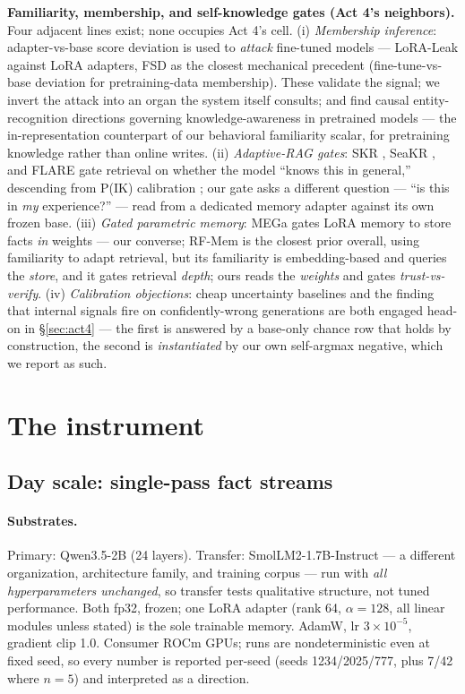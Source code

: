 \documentclass[11pt]{article}
\newcommand{\qwen}{Qwen3.5-2B}
\newcommand{\smol}{SmolLM2-1.7B-Instruct}
\begin{document}
\textbf{Familiarity, membership, and self-knowledge gates (Act 4's neighbors).} Four adjacent
lines exist; none occupies Act 4's cell. (i) \emph{Membership inference}: adapter-vs-base score
deviation is used to \emph{attack} fine-tuned models --- LoRA-Leak \citep{loraleak2025} against
LoRA adapters, FSD \citep{fsd2024} as the closest mechanical precedent (fine-tune-vs-base
deviation for pretraining-data membership). These validate the signal; we invert the attack into
an organ the system itself consults; and \citet{ferrando2025entity} find causal
entity-recognition directions governing knowledge-awareness in pretrained models --- the
in-representation counterpart of our behavioral familiarity scalar, for pretraining knowledge
rather than online writes. (ii) \emph{Adaptive-RAG gates}: SKR \citep{skr2023}, SeaKR
\citep{seakr2024}, and FLARE \citep{flare2023} gate retrieval on whether the model ``knows this
in general,'' descending from P(IK) calibration \citep{kadavath2022}; our gate asks a different
question --- ``is this in \emph{my} experience?'' --- read from a dedicated memory adapter
against its own frozen base. (iii) \emph{Gated parametric memory}: MEGa \citep{mega2025} gates
LoRA memory to store facts \emph{in} weights --- our converse; RF-Mem \citep{rfmem2026} is the
closest prior overall, using familiarity to adapt retrieval, but its familiarity is
embedding-based and queries the \emph{store}, and it gates retrieval \emph{depth}; ours reads
the \emph{weights} and gates \emph{trust-vs-verify}. (iv) \emph{Calibration objections}: cheap
uncertainty baselines \citep{cheapuncertainty2025} and the finding that internal signals fire on
confidently-wrong generations \citep{confidentwrong2025} are both engaged head-on in
\S\ref{sec:act4} --- the first is answered by a base-only chance row that holds by construction,
the second is \emph{instantiated} by our own self-argmax negative, which we report as such.

\section{The instrument}\label{sec:instrument}

\subsection{Day scale: single-pass fact streams}\label{sec:dayinstrument}

\paragraph{Substrates.} Primary: \qwen{} (24 layers). Transfer: \smol{} \citep{allal2025smollm2}
--- a different organization, architecture family, and training corpus --- run with \emph{all
hyperparameters unchanged}, so transfer tests qualitative structure, not tuned performance. Both
fp32, frozen; one LoRA adapter \citep{hu2022lora} (rank 64, $\alpha{=}128$, all linear modules
unless stated) is the sole trainable memory. AdamW, lr $3\times10^{-5}$, gradient clip 1.0.
Consumer ROCm GPUs; runs are nondeterministic even at fixed seed, so every number is reported
per-seed (seeds 1234/2025/777, plus 7/42 where $n{=}5$) and interpreted as a direction.
\end{document}
